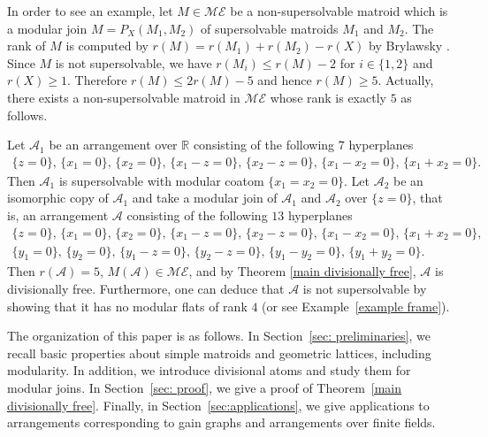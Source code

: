\documentclass[pdftex]{sigma}
\numberwithin{equation}{section}
\begin{document}
In order to see an example, let $ M \in \mathcal{ME} $ be a non-supersolvable matroid which is a modular join $ M=P_{X}(M_{1},M_{2}) $ of supersolvable matroids $ M_{1} $ and $ M_{2} $.
The rank of $ M $ is computed by $ r(M) = r(M_{1}) + r(M_{2}) - r(X) $ by Brylawsky \cite[Propositioin~5.2]{brylawski1975modular-totams}.
Since $ M $ is not supersolvable, we have $ r(M_{i}) \leq r(M)-2 $ for $ i \in \{1,2\} $ and $ r(X) \geq 1 $.
Therefore $ r(M) \leq 2r(M)-5 $ and hence $ r(M) \geq 5 $.
Actually, there exists a non-supersolvable matroid in $ \mathcal{ME} $ whose rank is exactly $ 5 $ as follows.

\begin{Example}\label{example intro}
Let $ \mathcal{A}_{1} $ be an arrangement over $ \mathbb{R} $ consisting of the following $ 7 $ hyperplanes
\begin{gather*}
\{z=0\}, \, \{x_{1}=0\}, \, \{x_{2}=0\}, \, \{x_{1}-z=0\}, \, \{x_{2}-z=0\}, \, \{x_{1}-x_{2}=0\}, \, \{x_{1}+x_{2}=0\}.
\end{gather*}
Then $ \mathcal{A}_{1} $ is supersolvable with modular coatom $ \{x_{1}=x_{2}=0\} $.
Let $ \mathcal{A}_{2} $ be an isomorphic copy of $ \mathcal{A}_{1} $ and take a modular join of $ \mathcal{A}_{1} $ and $ \mathcal{A}_{2} $ over $ \{z=0\} $, that is, an arrangement $ \mathcal{A} $ consisting of the following $ 13 $ hyperplanes
\begin{gather*}
\{z=0\}, \, \{x_{1}=0\}, \, \{x_{2}=0\}, \, \{x_{1}-z=0\}, \, \{x_{2}-z=0\}, \, \{x_{1}-x_{2}=0\}, \, \{x_{1}+x_{2}=0\}, \\
\{y_{1}=0\}, \, \{y_{2}=0\}, \, \{y_{1}-z=0\}, \, \{y_{2}-z=0\}, \, \{y_{1}-y_{2}=0\}, \, \{y_{1}+y_{2}=0\}.
\end{gather*}
Then $ r(\mathcal{A})=5$, $M(\mathcal{A}) \in \mathcal{ME} $, and by Theorem \ref{main divisionally free}, $ \mathcal{A} $ is divisionally free. Furthermore, one can deduce that $ \mathcal{A} $ is not supersolvable by showing that it has no modular flats of rank $ 4 $ (or see Example~\ref{example frame}).
\end{Example}

The organization of this paper is as follows.
In Section~\ref{sec: preliminaries}, we recall basic properties about simple matroids and geometric lattices, including modularity.
In addition, we introduce divisional atoms and study them for modular joins. In Section~\ref{sec: proof}, we give a proof of Theorem~\ref{main divisionally free}. Finally, in Section~\ref{sec:applications}, we give applications to arrangements corresponding to gain graphs and arrangements over finite fields.
\end{document}
